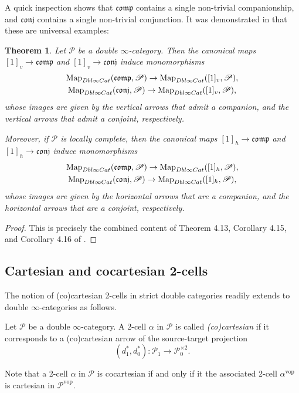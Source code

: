 \documentclass[a4paper, 11pt]{amsart}
\newtheorem{theorem}{Theorem}
\numberwithin{theorem}{section}
\theoremstyle{definition}
\newcommand{\cat}[1]{\textup{#1}}
\newcommand{\map}{\mathrm{Map}}
\renewcommand{\P}{\mathscr{P}}
\newcommand{\DbliCat}{\cat{Dbl}\infty\cat{Cat}}
\newcommand{\conj}{\mathfrak{conj}}
\newcommand{\comp}{\mathfrak{comp}}
\newcommand{\vop}{\mathrm{vop}}
\begin{document}
A quick inspection shows that $\comp$ contains a single non-trivial companionship, and $\conj$ contains a single non-trivial conjunction.
It was demonstrated in \cite{Comp} that these are universal examples:

\begin{theorem}\label{thm.free-living-comp}
	Let $\P$ be a double $\infty$-category.
	Then the canonical maps $[1]_v \to \comp$ and $[1]_v \to \conj$ induce monomorphisms
	\begin{gather*}
	\map_{\DbliCat}(\comp, \P) \to \map_{\DbliCat}([1]_v, \P), \\ \map_{\DbliCat}(\conj, \P) \to \map_{\DbliCat}([1]_v, \P),
	\end{gather*}
	whose images are given by the vertical arrows that admit a companion, and the vertical arrows that admit a conjoint, respectively.
	
	Moreover, if $\P$ is locally complete, then the canonical maps $[1]_h \to \comp$ and $[1]_h \to \conj$ induce monomorphisms
	\begin{gather*}
	\map_{\DbliCat}(\comp, \P) \to \map_{\DbliCat}([1]_h, \P), \\ \map_{\DbliCat}(\conj, \P) \to \map_{\DbliCat}([1]_h, \P),
	\end{gather*}
	whose images are given by the horizontal arrows that are a companion, and the horizontal arrows that are a conjoint, respectively.
\end{theorem}
\begin{proof}
	This is precisely the combined content of Theorem 4.13, Corollary 4.15, and Corollary 4.16 of \cite{Comp}.
\end{proof}

\subsection{Cartesian and cocartesian 2-cells} The notion of (co)cartesian 2-cells in strict double categories \cite[Section 4]{ShulmanFramedBicats} readily extends to double $\infty$-categories as follows.

\begin{definition}\label{def.cocart-cells}
	Let $\P$ be a double $\infty$-category.
	A 2-cell $\alpha$ in $\P$ is called \textit{(co)cartesian} if it corresponds to a (co)cartesian arrow 
	of the source-target projection 
	$$
	(d_1^*,d_0^*) : \P_1 \rightarrow \P_{0}^{\times 2}.
	$$
\end{definition}

\begin{remark}\label{rem.cart-cocart-duality}
	Note that a 2-cell $\alpha$ in $\P$ is cocartesian if and only if it the associated 2-cell $\alpha^\vop$ is cartesian in $\P^\vop$.
\end{remark}
\end{document}
